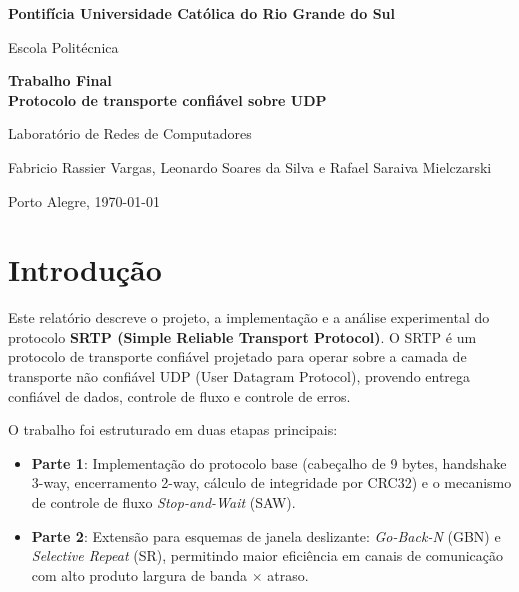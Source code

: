 \documentclass[12pt,a4paper]{article}
\begin{document}
\begin{titlepage}
  \centering
  \vspace*{1cm}
  {\LARGE\bfseries Pontifícia Universidade Católica do Rio Grande do Sul\par}
  \vspace{0.3cm}
  {\large Escola Politécnica\par}
  \vspace{3cm}
  {\LARGE\bfseries Trabalho Final\\
  Protocolo de transporte confiável sobre UDP\par}
  \vspace{0.5cm}
  {\large Laboratório de Redes de Computadores\par}
  \vspace{4cm}
  {\large Fabricio Rassier Vargas, Leonardo Soares da Silva e Rafael Saraiva Mielczarski\par}
  \vfill
  {\normalsize Porto Alegre, \today\par}
\end{titlepage}

\newpage
\tableofcontents
\newpage

\section{Introdução}
Este relatório descreve o projeto, a implementação e a análise experimental do protocolo \textbf{SRTP (Simple Reliable Transport Protocol)}. O SRTP é um protocolo de transporte confiável projetado para operar sobre a camada de transporte não confiável UDP (User Datagram Protocol), provendo entrega confiável de dados, controle de fluxo e controle de erros.

O trabalho foi estruturado em duas etapas principais:
\begin{itemize}
    \item \textbf{Parte 1}: Implementação do protocolo base (cabeçalho de 9 bytes, handshake 3-way, encerramento 2-way, cálculo de integridade por CRC32) e o mecanismo de controle de fluxo \textit{Stop-and-Wait} (SAW).
    \item \textbf{Parte 2}: Extensão para esquemas de janela deslizante: \textit{Go-Back-N} (GBN) e \textit{Selective Repeat} (SR), permitindo maior eficiência em canais de comunicação com alto produto largura de banda $\times$ atraso.
\end{itemize}
\end{document}
